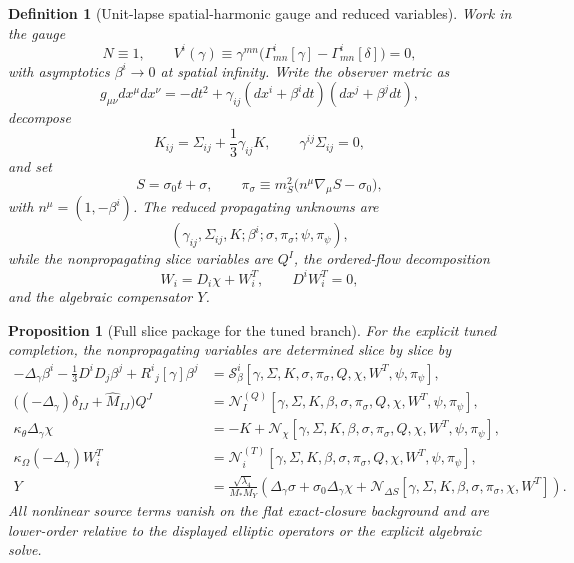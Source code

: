 \documentclass[11pt]{article}
\newtheorem{definition}{Definition}
\newtheorem{proposition}{Proposition}
\begin{document}
\begin{definition}[Unit-lapse spatial-harmonic gauge and reduced variables]
\label{def:gauge}
Work in the gauge
\begin{equation}
N\equiv 1,
\qquad
V^i(\gamma)\equiv \gamma^{mn}\bigl(\Gamma^i_{mn}[\gamma]-\Gamma^i_{mn}[\delta]\bigr)=0,
\label{eq:gauge}
\end{equation}
with asymptotics \(\beta^i\to 0\) at spatial infinity. Write the observer metric as
\begin{equation}
g_{\mu\nu}dx^\mu dx^\nu
=
-dt^2
+\gamma_{ij}(dx^i+\beta^idt)(dx^j+\beta^jdt),
\label{eq:ADM}
\end{equation}
decompose
\begin{equation}
K_{ij}
=
\Sigma_{ij}+\frac13\gamma_{ij}K,
\qquad
\gamma^{ij}\Sigma_{ij}=0,
\label{eq:Ksplit}
\end{equation}
and set
\begin{equation}
S=\sigma_0 t+\sigma,
\qquad
\pi_\sigma\equiv m_S^2\bigl(n^\mu\nabla_\mu S-\sigma_0\bigr),
\label{eq:pidef}
\end{equation}
with \(n^\mu=(1,-\beta^i)\). The reduced propagating unknowns are
\begin{equation}
(\gamma_{ij},\Sigma_{ij},K;\beta^i;\sigma,\pi_\sigma;\psi,\pi_\psi),
\label{eq:unknowns}
\end{equation}
while the nonpropagating slice variables are \(Q^I\), the ordered-flow decomposition
\begin{equation}
W_i=D_i\chi+W_i^T,
\qquad
D^iW_i^T=0,
\label{eq:Wdecomp}
\end{equation}
and the algebraic compensator \(Y\).
\end{definition}

\begin{proposition}[Full slice package for the tuned branch]
\label{prop:auxpackage}
For the explicit tuned completion, the nonpropagating variables are determined slice by slice by
\begin{align}
-\Delta_\gamma\beta^i
-\frac13 D^iD_j\beta^j
+R^i{}_j[\gamma]\beta^j
&=
\mathcal S_\beta^i[\gamma,\Sigma,K,\sigma,\pi_\sigma,Q,\chi,W^T,\psi,\pi_\psi],
\label{eq:betaeq}
\\
\bigl((-\Delta_\gamma)\delta_{IJ}+\widehat M_{IJ}\bigr)Q^J
&=
\mathcal N_I^{(Q)}[\gamma,\Sigma,K,\beta,\sigma,\pi_\sigma,Q,\chi,W^T,\psi,\pi_\psi],
\label{eq:Qeq}
\\
\kappa_\theta\Delta_\gamma\chi
&=
-K+\mathcal N_\chi[\gamma,\Sigma,K,\beta,\sigma,\pi_\sigma,Q,\chi,W^T,\psi,\pi_\psi],
\label{eq:chieq}
\\
\kappa_\Omega(-\Delta_\gamma)W_i^T
&=
\mathcal N_i^{(T)}[\gamma,\Sigma,K,\beta,\sigma,\pi_\sigma,Q,\chi,W^T,\psi,\pi_\psi],
\label{eq:WTeq}
\\
Y
&=
\frac{\sqrt{\lambda_4}}{M_*M_Y}
\left(
\Delta_\gamma\sigma+\sigma_0\Delta_\gamma\chi+\mathcal N_{\Delta S}[\gamma,\Sigma,K,\beta,\sigma,\pi_\sigma,\chi,W^T]
\right).
\label{eq:Yrec}
\end{align}
All nonlinear source terms vanish on the flat exact-closure background and are lower-order relative to the displayed elliptic operators or the explicit algebraic solve.
\end{proposition}
\end{document}
